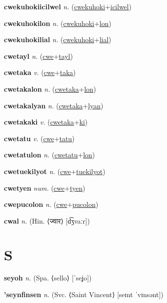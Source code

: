 \textbf{\hypertarget{cwekuhokiicilwel}{cwekuhokiicilwel}} \textit{n.} (\hyperlink{cwekuhoki}{cwekuhoki}+\allowbreak \hyperlink{icilwel}{icilwel})


\textbf{\hypertarget{cwekuhokilon}{cwekuhokilon}} \textit{n.} (\hyperlink{cwekuhoki}{cwekuhoki}+\allowbreak \hyperlink{lon}{lon})


\textbf{\hypertarget{cwekuhokilial}{cwekuhokilial}} \textit{n.} (\hyperlink{cwekuhoki}{cwekuhoki}+\allowbreak \hyperlink{lial}{lial})


\textbf{\hypertarget{cwetayl}{cwetayl}} \textit{n.} (\hyperlink{cwe}{cwe}+\allowbreak \hyperlink{tayl}{tayl})


\textbf{\hypertarget{cwetaka}{cwetaka}} \textit{v.} (\hyperlink{cwe}{cwe}+\allowbreak \hyperlink{taka}{taka})


\textbf{\hypertarget{cwetakalon}{cwetakalon}} \textit{n.} (\hyperlink{cwetaka}{cwetaka}+\allowbreak \hyperlink{lon}{lon})


\textbf{\hypertarget{cwetakalyan}{cwetakalyan}} \textit{n.} (\hyperlink{cwetaka}{cwetaka}+\allowbreak \hyperlink{lyan}{lyan})


\textbf{\hypertarget{cwetakaki}{cwetakaki}} \textit{v.} (\hyperlink{cwetaka}{cwetaka}+\allowbreak \hyperlink{ki}{ki})


\textbf{\hypertarget{cwetatu}{cwetatu}} \textit{v.} (\hyperlink{cwe}{cwe}+\allowbreak \hyperlink{tatu}{tatu})


\textbf{\hypertarget{cwetatulon}{cwetatulon}} \textit{n.} (\hyperlink{cwetatu}{cwetatu}+\allowbreak \hyperlink{lon}{lon})


\textbf{\hypertarget{cwetuekilyot}{cwetuekilyot}} \textit{n.} (\hyperlink{cwe}{cwe}+\allowbreak \hyperlink{tuekilyot}{tuekilyot})


\textbf{\hypertarget{cwetyen}{cwetyen}} \textit{num.} (\hyperlink{cwe}{cwe}+\allowbreak \hyperlink{tyen}{tyen})


\textbf{\hypertarget{cwepucolon}{cwepucolon}} \textit{n.} (\hyperlink{cwe}{cwe}+\allowbreak \hyperlink{pucolon}{pucolon})


\textbf{\hypertarget{cwal}{cwal}} \textit{n.} (Hin. ⟨{\devanagari{}ज्वार}⟩ [d͡ʒvaːr])


\section{S}

\textbf{\hypertarget{seyoh}{seyoh}} \textit{n.} (Spa. ⟨sello⟩ [ˈseʝo])


\textbf{\hypertarget{'seynfinsen}{'seynfinsen}} \textit{n.} (Svc. ⟨Saint Vincent⟩ [seɪnt ˈvɪnsənt])



